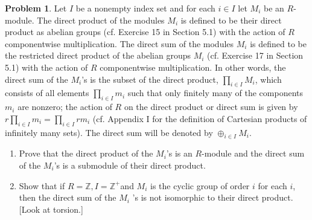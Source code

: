 \documentclass{amsart}
\numberwithin{equation}{section}
\theoremstyle{definition}
\newtheorem{problem}[thm]{Problem}
\begin{document}
\begin{problem}
  Let \(I\) be a nonempty index set and for each \(i \in I\) let \(M_i\) be an \(R\)-module. The direct product of the modules \(M_i\) is defined to be their direct product as abelian groups (cf. Exercise 15 in Section 5.1) with the action of \(R\) componentwise multiplication. The direct sum of the modules \(M_i\) is defined to be the restricted direct product of the abelian groups \(M_i\) (cf. Exercise 17 in Section 5.1) with the action of \(R\) componentwise multiplication. In other words, the direct sum of the \(M_i\)'s is the subset of the direct product, \(\prod_{i \in I} M_i\), which consists of all elements \(\prod_{i \in I} m_i\) such that only finitely many of the components \(m_i\) are nonzero; the action of \(R\) on the direct product or direct sum is given by \(r \prod_{i \in I} m_i=\prod_{i \in I} r m_i\) (cf. Appendix I for the definition of Cartesian products of infinitely many sets). The direct sum will be denoted by \(\oplus_{i \in I} M_i\).
  \begin{enumerate}
  \item Prove that the direct product of the \(M_i\)'s is an \(R\)-module and the direct sum of the \(M_i\)'s is a submodule of their direct product.
  \item Show that if \(R=\mathbb{Z}, I=\mathbb{Z}^{+}\)and \(M_i\) is the cyclic group of order \(i\) for each \(i\), then the direct sum of the \(M_i\) 's is not isomorphic to their direct product. [Look at torsion.]
  \end{enumerate}
\end{problem}
\end{document}
